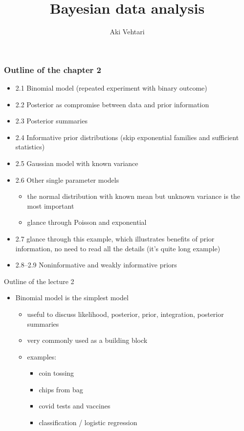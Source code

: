 \documentclass[english,t]{beamer}
\title[]{Bayesian data analysis}
\subtitle{}
\author{Aki Vehtari}
\institute[  Aalto]{}
\begin{document}
 

 \begin{frame}

   \frametitle{Outline of the chapter 2}

  \begin{itemize}
\item 2.1 Binomial model (repeated experiment with binary outcome)
\item 2.2 Posterior as compromise between data and prior information
\item 2.3 Posterior summaries
\item 2.4 Informative prior distributions (skip exponential families and sufficient statistics)
\item 2.5 Gaussian model with known variance
\item 2.6 Other single parameter models
  \begin{itemize}
  \item the normal distribution with known mean but
    unknown variance is the most important
  \item glance through Poisson and exponential
  \end{itemize}
\item 2.7 glance through this example, which illustrates benefits of prior information, no need to read all the details (it's quite long example)
\item 2.8--2.9 Noninformative and weakly informative priors
\end{itemize}

\end{frame}

 \begin{frame}{Outline of the lecture 2}

   \begin{itemize}
   \item Binomial model is the simplest model
     \begin{itemize}
     \item useful to discuss likelihood, posterior, prior,
       integration, posterior summaries
     \item very commonly used as a building block
     \item examples:
       \begin{itemize}
       \item coin tossing
       \item chips from bag
       \item covid tests and vaccines
       \item classification / logistic regression
       \end{itemize}
     \end{itemize}
   \end{itemize}
   
 \end{frame}
\end{document}
